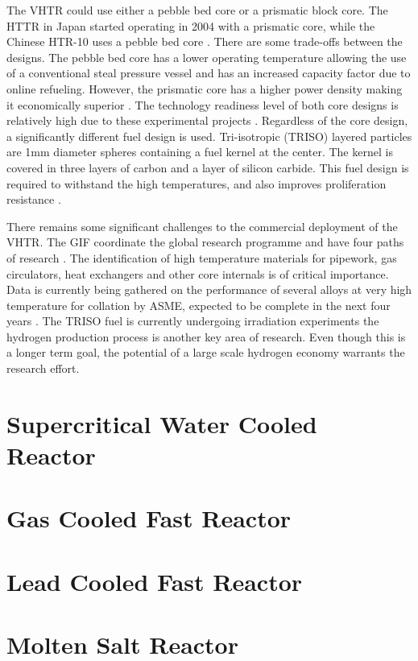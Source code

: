 \documentclass[journal]{IEEEtran}
\begin{document}
The VHTR could use either a pebble bed core or a prismatic block core.
The HTTR in Japan started operating in 2004 with a prismatic core, while the Chinese HTR-10 uses a pebble bed core \cite{Ftterer2014}.
There are some trade-offs between the designs.
The pebble bed core has a lower operating temperature allowing the use of a conventional steal pressure vessel and has an increased capacity factor due to online refueling.
However, the prismatic core has a higher power density making it economically superior \cite{Locatelli2013}.
The technology readiness level of both core designs is relatively high due to these experimental projects \cite{Ftterer2014}.
Regardless of the core design, a significantly different fuel design is used.
Tri-isotropic (TRISO) layered particles are 1mm diameter spheres containing a fuel kernel at the center.
The kernel is covered in three layers of carbon and a layer of silicon carbide.
This fuel design is required to withstand the high temperatures, and also improves proliferation resistance \cite{Marques2010a}.

There remains some significant challenges to the commercial deployment of the VHTR. 
The GIF coordinate the global research programme and have four paths of research \cite{GenIVForum}.
The identification of high temperature materials for pipework, gas circulators, heat exchangers and other core internals is of critical importance. 
Data is currently being gathered on the performance of several alloys at very high temperature for collation by ASME, expected to be complete in the next four years \cite{Ftterer2014}.
The TRISO fuel is currently undergoing irradiation experiments
the hydrogen production process is another key area of research. 
Even though this is a longer term goal, the potential of a large scale hydrogen economy warrants the research effort.
\section{Supercritical Water Cooled Reactor}

\section{Gas Cooled Fast Reactor}

\section{Lead Cooled Fast Reactor}

\section{Molten Salt Reactor}
\end{document}
